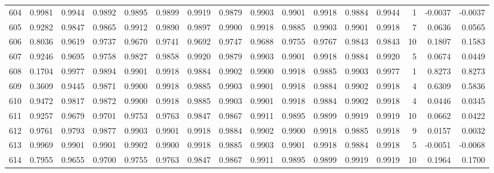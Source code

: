 \begin{tabular}{lrrrrrrrrrrrrrrr}
604 &      0.9981 &  0.9944 &  0.9892 &  0.9895 &  0.9899 &  0.9919 &  0.9879 &  0.9903 &  0.9901 &  0.9918 &   0.9884 &     0.9944 &      1 &                   -0.0037 &                    -0.0037 \\
605 &      0.9282 &  0.9847 &  0.9865 &  0.9912 &  0.9890 &  0.9897 &  0.9900 &  0.9918 &  0.9885 &  0.9903 &   0.9901 &     0.9918 &      7 &                    0.0636 &                     0.0565 \\
606 &      0.8036 &  0.9619 &  0.9737 &  0.9670 &  0.9741 &  0.9692 &  0.9747 &  0.9688 &  0.9755 &  0.9767 &   0.9843 &     0.9843 &     10 &                    0.1807 &                     0.1583 \\
607 &      0.9246 &  0.9695 &  0.9758 &  0.9827 &  0.9858 &  0.9920 &  0.9879 &  0.9903 &  0.9901 &  0.9918 &   0.9884 &     0.9920 &      5 &                    0.0674 &                     0.0449 \\
608 &      0.1704 &  0.9977 &  0.9894 &  0.9901 &  0.9918 &  0.9884 &  0.9902 &  0.9900 &  0.9918 &  0.9885 &   0.9903 &     0.9977 &      1 &                    0.8273 &                     0.8273 \\
609 &      0.3609 &  0.9445 &  0.9871 &  0.9900 &  0.9918 &  0.9885 &  0.9903 &  0.9901 &  0.9918 &  0.9884 &   0.9902 &     0.9918 &      4 &                    0.6309 &                     0.5836 \\
610 &      0.9472 &  0.9817 &  0.9872 &  0.9900 &  0.9918 &  0.9885 &  0.9903 &  0.9901 &  0.9918 &  0.9884 &   0.9902 &     0.9918 &      4 &                    0.0446 &                     0.0345 \\
611 &      0.9257 &  0.9679 &  0.9701 &  0.9753 &  0.9763 &  0.9847 &  0.9867 &  0.9911 &  0.9895 &  0.9899 &   0.9919 &     0.9919 &     10 &                    0.0662 &                     0.0422 \\
612 &      0.9761 &  0.9793 &  0.9877 &  0.9903 &  0.9901 &  0.9918 &  0.9884 &  0.9902 &  0.9900 &  0.9918 &   0.9885 &     0.9918 &      9 &                    0.0157 &                     0.0032 \\
613 &      0.9969 &  0.9901 &  0.9901 &  0.9902 &  0.9900 &  0.9918 &  0.9885 &  0.9903 &  0.9901 &  0.9918 &   0.9884 &     0.9918 &      5 &                   -0.0051 &                    -0.0068 \\
614 &      0.7955 &  0.9655 &  0.9700 &  0.9755 &  0.9763 &  0.9847 &  0.9867 &  0.9911 &  0.9895 &  0.9899 &   0.9919 &     0.9919 &     10 &                    0.1964 &                     0.1700 \\

\end{tabular}

